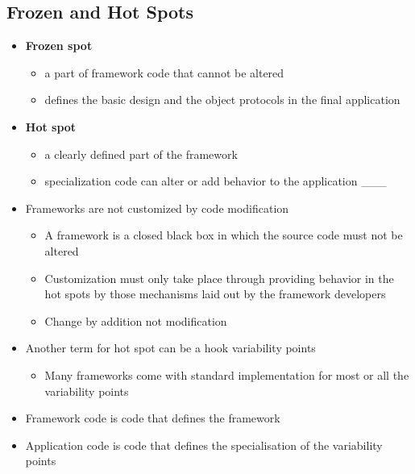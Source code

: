 \documentclass[11pt]{article}
\providecommand{\tightlist}{%
      \setlength{\itemsep}{0pt}\setlength{\parskip}{0pt}}
\begin{document}
\hypertarget{frozen-and-hot-spots}{%
\subsection{Frozen and Hot Spots}\label{frozen-and-hot-spots}}

\begin{itemize}
\tightlist
\item
  \textbf{Frozen spot}

  \begin{itemize}
  \tightlist
  \item
    a part of framework code that cannot be altered
  \item
    defines the basic design and the object protocols in the final
    application
  \end{itemize}
\item
  \textbf{Hot spot}

  \begin{itemize}
  \tightlist
  \item
    a clearly defined part of the framework
  \item
    specialization code can alter or add behavior to the application
    \_\_\_
  \end{itemize}
\item
  Frameworks are not customized by code modification

  \begin{itemize}
  \tightlist
  \item
    A framework is a closed black box in which the source code must not
    be altered
  \item
    Customization must only take place through providing behavior in the
    hot spots by those mechanisms laid out by the framework developers
  \item
    Change by addition not modification
  \end{itemize}
\item
  Another term for hot spot can be a hook variability points

  \begin{itemize}
  \tightlist
  \item
    Many frameworks come with standard implementation for most or all
    the variability points
  \end{itemize}
\item
  Framework code is code that defines the framework
\item
  Application code is code that defines the specialisation of the
  variability points
\end{itemize}
\end{document}

